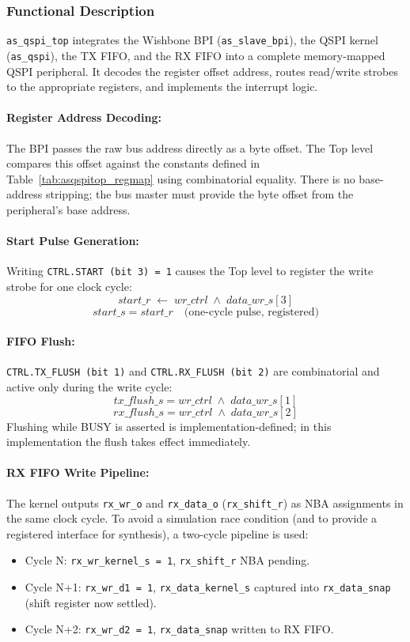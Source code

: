 \subsubsection{Functional Description}

\texttt{as\_qspi\_top} integrates the Wishbone BPI (\texttt{as\_slave\_bpi}),
the QSPI kernel (\texttt{as\_qspi}), the TX FIFO, and the RX FIFO into a
complete memory-mapped QSPI peripheral. It decodes the register offset address,
routes read/write strobes to the appropriate registers, and implements the
interrupt logic.

\paragraph{Register Address Decoding:}
The BPI passes the raw bus address directly as a byte offset. The Top level
compares this offset against the constants defined in Table~\ref{tab:asqspitop_regmap}
using combinatorial equality. There is no base-address stripping; the bus master
must provide the byte offset from the peripheral's base address.

\paragraph{Start Pulse Generation:}
Writing \texttt{CTRL.START (bit 3) = 1} causes the Top level to register the
write strobe for one clock cycle:
\[
  start\_r \;\leftarrow\; wr\_ctrl \;\land\; data\_wr\_s[3]
\]
\[
  start\_s = start\_r \quad \text{(one-cycle pulse, registered)}
\]

\paragraph{FIFO Flush:}
\texttt{CTRL.TX\_FLUSH (bit 1)} and \texttt{CTRL.RX\_FLUSH (bit 2)} are
combinatorial and active only during the write cycle:
\[
  tx\_flush\_s = wr\_ctrl \;\land\; data\_wr\_s[1]
\]
\[
  rx\_flush\_s = wr\_ctrl \;\land\; data\_wr\_s[2]
\]
Flushing while BUSY is asserted is implementation-defined; in this
implementation the flush takes effect immediately.

\paragraph{RX FIFO Write Pipeline:}
The kernel outputs \texttt{rx\_wr\_o} and \texttt{rx\_data\_o} (\texttt{rx\_shift\_r})
as NBA assignments in the same clock cycle. To avoid a simulation race condition
(and to provide a registered interface for synthesis), a two-cycle pipeline
is used:
\begin{itemize}
  \item Cycle N: \texttt{rx\_wr\_kernel\_s = 1}, \texttt{rx\_shift\_r} NBA pending.
  \item Cycle N+1: \texttt{rx\_wr\_d1 = 1}, \texttt{rx\_data\_kernel\_s} captured
    into \texttt{rx\_data\_snap} (shift register now settled).
  \item Cycle N+2: \texttt{rx\_wr\_d2 = 1}, \texttt{rx\_data\_snap} written to RX FIFO.
\end{itemize}

